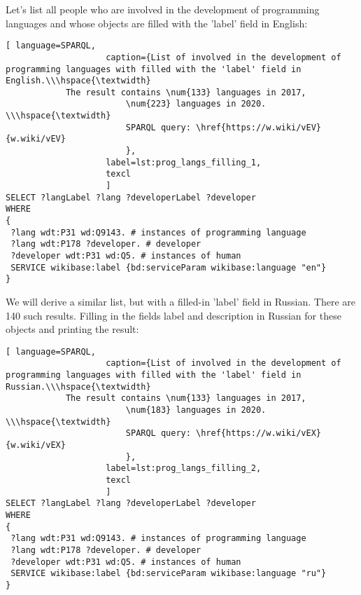 Let's list all people who are involved in the development of programming languages and whose objects are filled with the 'label' field in English:

\begin{lstlisting}[ language=SPARQL, 
                    caption={List of involved in the development of programming languages with filled with the 'label' field in English.\\\hspace{\textwidth}
			The result contains \num{133} languages in 2017, 
                        \num{223} languages in 2020. \\\hspace{\textwidth}
                        SPARQL query: \href{https://w.wiki/vEV}{w.wiki/vEV}
                        },
                    label=lst:prog_langs_filling_1,
                    texcl 
                    ]
SELECT ?langLabel ?lang ?developerLabel ?developer
WHERE
{
 ?lang wdt:P31 wd:Q9143. # instances of programming language
 ?lang wdt:P178 ?developer. # developer 
 ?developer wdt:P31 wd:Q5. # instances of human
 SERVICE wikibase:label {bd:serviceParam wikibase:language "en"}
}
\end{lstlisting}%

We will derive a similar list, but with a filled-in 'label' field in Russian. There are 140 such results. Filling in the fields label and description in Russian for these objects and printing the result:

\begin{lstlisting}[ language=SPARQL, 
                    caption={List of involved in the development of programming languages with filled with the 'label' field in Russian.\\\hspace{\textwidth}
			The result contains \num{133} languages in 2017, 
                        \num{183} languages in 2020. \\\hspace{\textwidth}
                        SPARQL query: \href{https://w.wiki/vEX}{w.wiki/vEX}
                        },
                    label=lst:prog_langs_filling_2,
                    texcl 
                    ]
SELECT ?langLabel ?lang ?developerLabel ?developer
WHERE
{
 ?lang wdt:P31 wd:Q9143. # instances of programming language
 ?lang wdt:P178 ?developer. # developer 
 ?developer wdt:P31 wd:Q5. # instances of human
 SERVICE wikibase:label {bd:serviceParam wikibase:language "ru"}
}
\end{lstlisting}%


